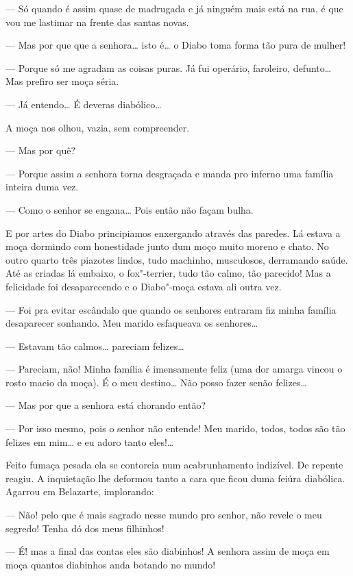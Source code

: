 --- Só quando é assim quase de madrugada e já ninguém mais está na rua,
é que vou me lastimar na frente das santas novas.

--- Mas por que que a senhora\ldots{} isto é\ldots{} o Diabo toma forma tão pura
de mulher!

--- Porque só me agradam as coisas puras. Já fui operário, faroleiro,
defunto\ldots{} Mas prefiro ser moça séria.

--- Já entendo\ldots{} É deveras diabólico\ldots{}

A moça nos olhou, vazia, sem compreender.

--- Mas por quê?

--- Porque assim a senhora torna desgraçada e manda pro inferno uma
família inteira duma vez.

--- Como o senhor se engana\ldots{} Pois então não façam bulha.

E por artes do Diabo principiamos enxergando através das paredes. Lá
estava a moça dormindo com honestidade junto dum moço muito moreno e
chato. No outro quarto três piazotes lindos, tudo machinho, musculosos,
derramando saúde. Até as criadas lá embaixo, o fox"-terrier, tudo tão
calmo, tão parecido! Mas a felicidade foi desaparecendo e o Diabo"-moça
estava ali outra vez.

--- Foi pra evitar escândalo que quando os senhores entraram fiz minha
família desaparecer sonhando. Meu marido esfaqueava os senhores\ldots{}

--- Estavam tão calmos\ldots{} pareciam felizes\ldots{}

--- Pareciam, não! Minha família é imensamente feliz (uma dor amarga
vincou o rosto macio da moça). É o meu destino\ldots{} Não posso fazer senão
felizes\ldots{}

--- Mas por que a senhora está chorando então?

--- Por isso mesmo, pois o senhor não entende! Meu marido, todos, todos
são tão felizes em mim\ldots{} e eu adoro tanto eles!\ldots{}

Feito fumaça pesada ela se contorcia num acabrunhamento indizível. De
repente reagiu. A inquietação lhe deformou tanto a cara que ficou duma
feiúra diabólica. Agarrou em Belazarte, implorando:

--- Não! pelo que é mais sagrado nesse mundo pro senhor, não revele o
meu segredo! Tenha dó dos meus filhinhos!

--- É! mas a final das contas eles são diabinhos! A senhora assim de
moça em moça quantos diabinhos anda botando no mundo!

